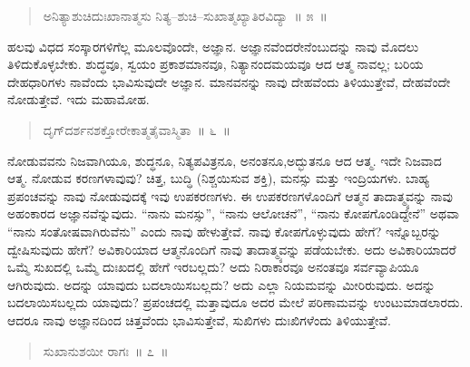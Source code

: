 \vspace{-0.2cm}

\begin{verse}
ಅನಿತ್ಯಾಶುಚಿದುಃಖಾನಾತ್ಮಸು ನಿತ್ಯ–ಶುಚಿ–ಸುಖಾತ್ಮಖ್ಯಾತಿರವಿದ್ಯಾ~॥ ೫~॥
\end{verse}

\vspace{-0.4cm}


\vskip 0.2cm

ಹಲವು ವಿಧದ ಸಂಸ್ಕಾರಗಳಿಗೆಲ್ಲ ಮೂಲವೊಂದೇ, ಅಜ್ಞಾನ. ಅಜ್ಞಾನವೆಂದರೇನೆಂಬು\break ದನ್ನು ನಾವು ಮೊದಲು ತಿಳಿದುಕೊಳ್ಳಬೇಕು. ಶುದ್ಧವೂ, ಸ್ವಯಂ ಪ್ರಕಾಶಮಾನವೂ, ನಿತ್ಯಾನಂದಮಯವೂ ಆದ ಆತ್ಮ ನಾವಲ್ಲ; ಬರಿಯ ದೇಹಧಾರಿಗಳು ನಾವೆಂದು ಭಾವಿಸುವುದೇ ಅಜ್ಞಾನ. ಮಾನವನನ್ನು ನಾವು ದೇಹವೆಂದು ತಿಳಿಯುತ್ತೇವೆ, ದೇಹವೆಂದೇ ನೋಡುತ್ತೇವೆ. ಇದು ಮಹಾಮೋಹ. 

\vspace{-0.2cm}

\begin{verse}
ದೃಗ್​ದರ್ಶನಶಕ್ತೋರೇಕಾತ್ಮತೈವಾಸ್ಮಿತಾ~॥ ೬~॥
\end{verse}

\vspace{-0.4cm}


\vskip 0.2cm

ನೋಡುವವನು ನಿಜವಾಗಿಯೂ, ಶುದ್ಧನೂ, ನಿತ್ಯಪವಿತ್ರನೂ, ಅನಂತನೂ,\break ಅದ್ಭುತನೂ ಆದ ಆತ್ಮ. ಇದೇ ನಿಜವಾದ ಆತ್ಮ. ನೋಡುವ ಕರಣಗಳಾವುವು? ಚಿತ್ತ, ಬುದ್ಧಿ (ನಿಶ್ಚಯಿಸುವ ಶಕ್ತಿ), ಮನಸ್ಸು ಮತ್ತು ಇಂದ್ರಿಯಗಳು. ಬಾಹ್ಯ ಪ್ರಪಂಚವನ್ನು ನಾವು ನೋಡುವುದಕ್ಕೆ ಇವು ಉಪಕರಣಗಳು. ಈ ಉಪಕರಣಗಳೊಂದಿಗೆ ಆತ್ಮನ ತಾದಾತ್ಮ್ಯವನ್ನು ನಾವು ಅಹಂಕಾರದ ಅಜ್ಞಾನವೆನ್ನುವುದು. “ನಾನು ಮನಸ್ಸು”, “ನಾನು ಆಲೋಚನೆ”, “ನಾನು ಕೋಪಗೊಂಡಿದ್ದೇನೆ” ಅಥವಾ “ನಾನು ಸಂತೋಷವಾಗಿರುವೆನು” ಎಂದು ನಾವು ಹೇಳುತ್ತೇವೆ. ನಾವು ಕೋಪಗೊಳ್ಳುವುದು ಹೇಗೆ? ಇನ್ನೊಬ್ಬರನ್ನು ದ್ವೇಷಿಸುವುದು ಹೇಗೆ? ಅವಿಕಾರಿಯಾದ ಆತ್ಮನೊಂದಿಗೆ ನಾವು ತಾದಾತ್ಮ್ಯವನ್ನು ಪಡೆಯಬೇಕು. ಅದು ಅವಿಕಾರಿಯಾದರೆ ಒಮ್ಮೆ ಸುಖದಲ್ಲಿ ಒಮ್ಮೆ ದುಃಖದಲ್ಲಿ ಹೇಗೆ ಇರಬಲ್ಲದು? ಅದು ನಿರಾಕಾರವೂ ಅನಂತವೂ ಸರ್ವವ್ಯಾಪಿಯೂ ಆಗಿರುವುದು. ಅದನ್ನು ಯಾವುದು ಬದಲಾಯಿಸಬಲ್ಲದು? ಅದು ಎಲ್ಲಾ ನಿಯಮವನ್ನು ಮೀರಿರುವುದು. ಅದನ್ನು ಬದಲಾಯಿಸಬಲ್ಲದು ಯಾವುದು? ಪ್ರಪಂಚದಲ್ಲಿ ಮತ್ತಾವುದೂ ಅದರ ಮೇಲೆ ಪರಿಣಾಮವನ್ನು ಉಂಟುಮಾಡಲಾರದು. ಆದರೂ ನಾವು ಅಜ್ಞಾನದಿಂದ ಚಿತ್ತವೆಂದು ಭಾವಿಸುತ್ತೇವೆ, ಸುಖಿಗಳು ದುಃಖಿಗಳೆಂದು ತಿಳಿಯುತ್ತೇವೆ. 

\vspace{-0.2cm}

\begin{verse}
ಸುಖಾನುಶಯೀ ರಾಗಃ~॥ ೭~॥
\end{verse}


